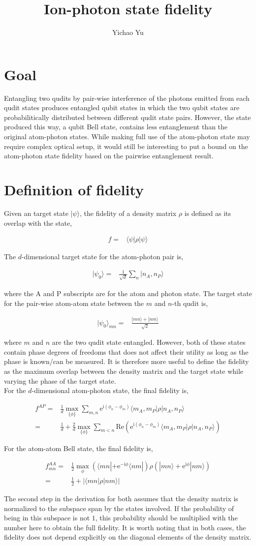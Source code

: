 \documentclass[10pt,fleqn]{article}
\title{Ion-photon state fidelity}
\author{Yichao Yu}
\newcommand{\ue}{\mathrm{e}}
\newcommand{\ui}{\mathrm{i}}
\newcommand{\eqar}[1]
{
  \begin{align}
    #1
  \end{align}
}
\newcommand{\paren}[1]{{\left({#1}\right)}}
\newcommand{\abs}[1]{{\left|{#1}\right|}}
\begin{document}
\maketitle

\section{Goal}

Entangling two qudits by pair-wise interference of the photons emitted from each qudit states produces entangled qubit states in which the two qubit states are probabilitically distributed between different qudit state pairs.
However, the state produced this way, a qubit Bell state, contains less entanglement than the original atom-photon states.
While making full use of the atom-photon state may require complex optical setup, it would still be interesting to put a bound on the atom-photon state fidelity based on the pairwise entanglement result.

\section{Definition of fidelity}
Given an target state $|\psi\rangle$, the fidelity of a density matrix $\rho$ is defined as its overlap with the state,
\eqar{
  f=&\langle\psi|\rho|\psi\rangle
}

The $d$-dimensional target state for the atom-photon pair is,
\eqar{
  |\psi_0\rangle=&\frac{1}{\sqrt{d}}\sum_{n}|n_A,n_P\rangle
}
where the A and P subscripts are for the atom and photon state. The target state for the pair-wise atom-atom state between the $m$ and $n$-th qudit is,
\eqar{
  |\psi_0\rangle_{mn}=&\frac{|mn\rangle+|nm\rangle}{\sqrt{2}}
}
where $m$ and $n$ are the two qudit state entangled.
However, both of these states contain phase degrees of freedoms that does not affect their utility as long as the phase is known/can be measured.
It is therefore more useful to define the fidelity as the maximum overlap between the density matrix and the target state while varying the phase of the target state.\\

For the $d$-dimensional atom-photon state, the final fidelity is,
\eqar{
  \label{eq:fid-ap}
  f^{AP}=&\frac{1}{d}\max_{\{\phi\}}\sum_{m,n}\ue^{\ui\paren{\phi_n-\phi_m}}\langle m_A,m_P|\rho|n_A,n_P\rangle\nonumber\\
  =&\frac{1}{d}+\frac{2}{d}\max_{\{\phi\}}\sum_{m<n}\mathrm{Re}\paren{\ue^{\ui\paren{\phi_n-\phi_m}}\langle m_A,m_P|\rho|n_A,n_P\rangle}
}
For the atom-atom Bell state, the final fidelity is,
\eqar{
  \label{eq:fid-aa}
  f^{AA}_{mn}=&\frac12\max_{\phi}\paren{\langle mn|+\ue^{-\ui\phi}\langle nm|}\rho\paren{|mn\rangle+\ue^{\ui\phi}|nm\rangle}\nonumber\\
  =&\frac12+\abs{\langle mn|\rho|nm\rangle}
}
The second step in the derivation for both assumes that the density matrix is normalized to the subspace span by the states involved.
If the probability of being in this subspace is not $1$, this probability should be multiplied with the number here to obtain the full fidelity.
It is worth noting that in both cases, the fidelity does not depend explicitly on the diagonal elements of the density matrix.
\end{document}

